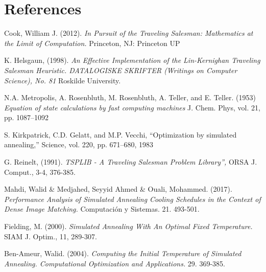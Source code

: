 \documentclass{article}
\begin{document}
\section{References}

\begin{thebibliography}{9}

Cook, William J. (2012). \emph{In Pursuit of the Traveling Salesman: Mathematics at the Limit of Computation.} Princeton, NJ: Princeton UP

K. Helsgaun, (1998). \emph{An Effective Implementation of the Lin-Kernighan Traveling Salesman Heuristic. DATALOGISKE SKRIFTER (Writings on Computer Science), No. 81} Roskilde University.

N.A. Metropolis, A. Rosenbluth, M. Rosenbluth, A. Teller, and E. Teller. (1953) \emph{Equation of state calculations by
fast computing machines} J. Chem. Phys, vol. 21, pp. 1087–1092

S. Kirkpatrick, C.D. Gelatt, and M.P. Vecchi, “Optimization by simulated annealing,” Science, vol. 220, pp.
671–680, 1983

G. Reinelt, (1991). \emph{TSPLIB - A Traveling Salesman Problem Library”,} ORSA J. Comput., 3-4, 376-385.

Mahdi, Walid \& Medjahed, Seyyid Ahmed \& Ouali, Mohammed. (2017). \emph{Performance Analysis of Simulated Annealing Cooling Schedules in the Context of Dense Image Matching.} Computación y Sistemas. 21. 493-501.

Fielding, M. (2000). \emph{Simulated Annealing With An Optimal Fixed Temperature.} SIAM J. Optim., 11, 289-307.

Ben-Ameur, Walid. (2004). \emph{Computing the Initial Temperature of Simulated Annealing. Computational Optimization and Applications.} 29. 369-385.



\end{thebibliography}
\end{document}
